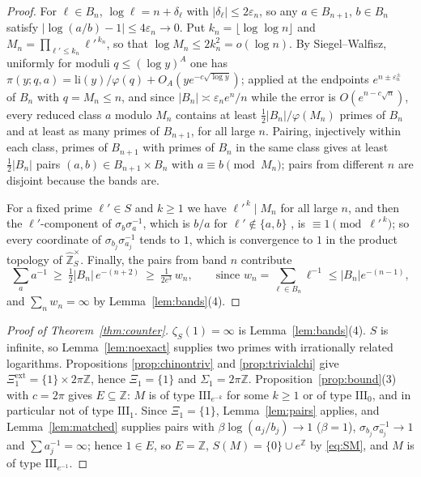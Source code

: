 \documentclass[11pt]{amsart}
\numberwithin{equation}{section}
\theoremstyle{definition}
\theoremstyle{remark}
\newcommand{\Z}{\mathbb{Z}}
\newcommand{\hZ}{\widehat{\mathbb{Z}}}
\begin{document}
\begin{proof}
For $\ell\in B_n$, $\log\ell=n+\delta_\ell$ with $|\delta_\ell|\le2\varepsilon_n$, so any
$a\in B_{n+1}$, $b\in B_n$ satisfy $|\log(a/b)-1|\le4\varepsilon_n\to0$. Put
$k_n=\lfloor\log\log n\rfloor$ and $M_n=\prod_{\ell'\le k_n}\ell'^{\,k_n}$, so that
$\log M_n\le2k_n^2=o(\log n)$. By Siegel--Walfisz, uniformly for moduli
$q\le(\log y)^{A}$ one has $\pi(y;q,a)=\mathrm{li}(y)/\varphi(q)+O_A(ye^{-c\sqrt{\log y}})$;
applied at the endpoints $e^{n\pm\varepsilon_n^\pm}$ of $B_n$ with $q=M_n\le n$, and since
$|B_n|\asymp\varepsilon_ne^n/n$ while the error is $O(e^{n-c\sqrt n})$, every reduced class
$a$ modulo $M_n$ contains at least $\tfrac12|B_n|/\varphi(M_n)$ primes of $B_n$ and at least
as many primes of $B_{n+1}$, for all large $n$. Pairing, injectively within each class,
primes of $B_{n+1}$ with primes of $B_n$ in the same class gives at least $\tfrac12|B_n|$
pairs $(a,b)\in B_{n+1}\times B_n$ with $a\equiv b\pmod{M_n}$; pairs from different $n$ are
disjoint because the bands are.

For a fixed prime $\ell'\in S$ and $k\ge1$ we have $\ell'^{\,k}\mid M_n$ for all large $n$,
and then the $\ell'$-component of $\sigma_b\sigma_a^{-1}$, which is $b/a$ for
$\ell'\notin\{a,b\}$ \cite[Lem.~2.10(1)]{Main}, is $\equiv1\pmod{\ell'^{\,k}}$; so every
coordinate of $\sigma_{b_j}\sigma_{a_j}^{-1}$ tends to $1$, which is convergence to $1$ in
the product topology of $\hZ_S^\times$. Finally, the pairs from band $n$ contribute
\[
\sum_{a}a^{-1}\ \ge\ \tfrac12|B_n|\,e^{-(n+2)}\ \ge\ \tfrac1{2e^{3}}\,w_n,
\qquad\text{since } w_n=\sum_{\ell\in B_n}\ell^{-1}\le|B_n|e^{-(n-1)},
\]
and $\sum_nw_n=\infty$ by Lemma~\ref{lem:bands}(4).
\end{proof}

\begin{proof}[Proof of Theorem~\ref{thm:counter}]
$\zeta_S(1)=\infty$ is Lemma~\ref{lem:bands}(4). $S$ is infinite, so
Lemma~\ref{lem:noexact} supplies two primes with irrationally related logarithms.
Propositions \ref{prop:chinontriv} and \ref{prop:trivialchi} give
$\Xi^{\mathrm{ext}}_1=\{1\}\times2\pi\Z$, hence $\Xi_1=\{1\}$ and $\Sigma_1=2\pi\Z$.
Proposition~\ref{prop:bound}(3) with $c=2\pi$ gives $E\subseteq\Z$: $M$ is of type
$\mathrm{III}_{e^{-k}}$ for some $k\ge1$ or of type $\mathrm{III}_0$, and in particular not
of type $\mathrm{III}_1$. Since $\Xi_1=\{1\}$, Lemma~\ref{lem:pairs} applies, and
Lemma~\ref{lem:matched} supplies pairs with $\beta\log(a_j/b_j)\to1$ ($\beta=1$),
$\sigma_{b_j}\sigma_{a_j}^{-1}\to1$ and $\sum a_j^{-1}=\infty$; hence $1\in E$, so $E=\Z$,
$S(M)=\{0\}\cup e^{\Z}$ by \eqref{eq:SM}, and $M$ is of type $\mathrm{III}_{e^{-1}}$.
\end{proof}
\end{document}
